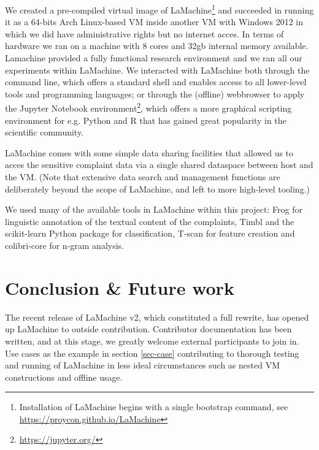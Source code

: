 \documentclass[a4paper,11pt]{article}
\begin{document}
We created a pre-compiled virtual image of LaMachine\footnote{ Installation of LaMachine begins with a single bootstrap command, see
\url{https://proycon.github.io/LaMachine}} and succeeded in running it as a 64-bits Arch Linux-based VM inside another VM with Windows 2012 in which we did have administrative rights but no internet acces. In terms of hardware we ran on a machine with 8 cores and  32gb internal memory available.
Lamachine provided a fully functional research environment and we ran all our experiments within LaMachine. We interacted with LaMachine both through the command line, which offers a standard
shell and enables access to all lower-level tools and programming languages; or through the (offline) webbrowser to apply the Jupyter Notebook environment\footnote{\url{https://jupyter.org/}}, which offers a more graphical scripting environment
for e.g. Python and R that has gained great popularity in the scientific community.

LaMachine comes with some simple data sharing facilities that allowed us to acces the sensitive complaint data via a  single shared dataspace between host and the VM. (Note that extensive data search and management functions are deliberately beyond the scope of LaMachine, and left to more high-level tooling.)

We used many of the available tools in LaMachine within this project: Frog for linguistic annotation of the textual content of the complaints, Timbl and the scikit-learn Python package \cite{scikit-learn} for classification, T-scan for feature creation and colibri-core for n-gram analysis.



\section{Conclusion \& Future work}

The recent release of LaMachine v2, which constituted a full rewrite, has opened up LaMachine to outside
contribution. Contributor documentation has been written, and at this stage, we greatly welcome external participants
to join in. Use cases as the example in section \ref{sec-case} contributing to thorough testing and running of LaMachine in less ideal circumstances such as nested VM constructions and offline usage.
\end{document}
